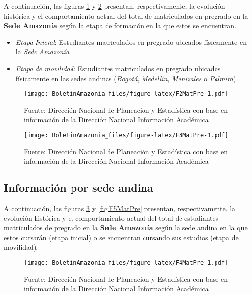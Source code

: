 \documentclass[
]{book}
\begin{document}
A continuación, las figuras \ref{fig:F2MatPre} y \ref{fig:F3MatPre} presentan, respectivamente, la evolución histórica y el comportamiento actual del total de matriculados en pregrado en la \textbf{Sede Amazonía} según la etapa de formación en la que estos se encuentran.

\begin{itemize}
\item
  \emph{Etapa Inicial}: Estudiantes matriculados en pregrado ubicados físicamente en la \emph{Sede Amazonía}
\item
  \emph{Etapa de movilidad}: Estudiantes matriculados en pregrado ubicados físicamente en las sedes andinas (\emph{Bogotá}, \emph{Medellín}, \emph{Manizales} o \emph{Palmira}).
\end{itemize}

\begin{figure}
\centering
\texttt{[image: BoletinAmazonia\_files/figure-latex/F2MatPre-1.pdf]}
\caption{\label{fig:F2MatPre}Fuente: Dirección Nacional de Planeación y Estadística con base en información de la Dirección Nacional Información Académica}
\end{figure}

\begin{figure}
\centering
\texttt{[image: BoletinAmazonia\_files/figure-latex/F3MatPre-1.pdf]}
\caption{\label{fig:F3MatPre}Fuente: Dirección Nacional de Planeación y Estadística con base en información de la Dirección Nacional Información Académica}
\end{figure}

\hypertarget{informaciuxf3n-por-sede-andina}{%
\subsection{Información por sede andina}\label{informaciuxf3n-por-sede-andina}}

A continuación, las figuras \ref{fig:F4MatPre} y \ref{fig:F5MatPre} presentan, respectivamente, la evolución histórica y el comportamiento actual del total de estudiantes matriculados de pregrado en la \textbf{Sede Amazonía} según la sede andina en la que estos cursarán (etapa inicial) o se encuentran cursando sus estudios (etapa de movilidad).

\begin{figure}
\centering
\texttt{[image: BoletinAmazonia\_files/figure-latex/F4MatPre-1.pdf]}
\caption{\label{fig:F4MatPre}Fuente: Dirección Nacional de Planeación y Estadística con base en información de la Dirección Nacional Información Académica}
\end{figure}
\end{document}
